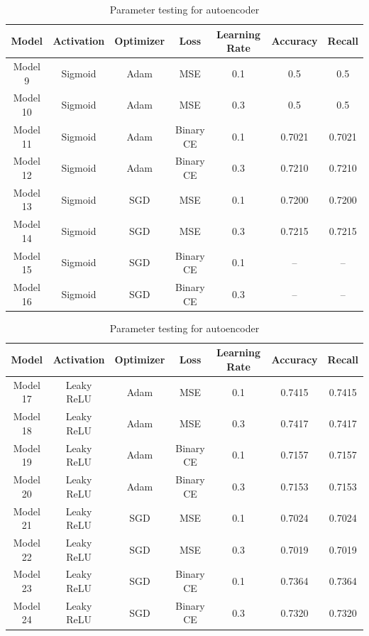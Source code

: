 \begin{table}[H]
    \centering
    \begin{tabular}{|c|c|c|c|c|c|c|}
        \hline
        \rowcolor{lightgreen}
        \textbf{Model} & \textbf{Activation} & \textbf{Optimizer} & \textbf{Loss} & \textbf{Learning Rate} & \textbf{Accuracy} & \textbf{Recall} \\
        \hline
        Model 9 & Sigmoid & Adam & MSE & 0.1 & 0.5 & 0.5 \\
        \hline
        Model 10 & Sigmoid & Adam & MSE & 0.3 & 0.5 & 0.5 \\
        \hline
        Model 11 & Sigmoid & Adam & Binary CE & 0.1 & 0.7021 & 0.7021 \\
        \hline
        Model 12 & Sigmoid & Adam & Binary CE & 0.3 & 0.7210 & 0.7210 \\
        \hline
        Model 13 & Sigmoid & SGD & MSE & 0.1 & 0.7200 & 0.7200 \\
        \hline
        Model 14 & Sigmoid & SGD & MSE & 0.3 & 0.7215 & 0.7215 \\
        \hline
        Model 15 & Sigmoid & SGD & Binary CE & 0.1 & -- & -- \\
        \hline
        Model 16 & Sigmoid & SGD & Binary CE & 0.3 & -- & -- \\
        \hline
    \end{tabular}
    \caption{Parameter testing for autoencoder}
    \label{tab:op2}
\end{table}
\begin{table}[H]
    \centering
    \begin{tabular}{|c|c|c|c|c|c|c|}
        \hline
        \rowcolor{lightgreen}
        \textbf{Model} & \textbf{Activation} & \textbf{Optimizer} & \textbf{Loss} & \textbf{Learning Rate} & \textbf{Accuracy} & \textbf{Recall} \\
        \hline
        Model 17 & Leaky ReLU & Adam & MSE & 0.1 & 0.7415 & 0.7415 \\
        \hline
        Model 18 & Leaky ReLU & Adam & MSE & 0.3 & 0.7417 & 0.7417 \\
        \hline
        Model 19 & Leaky ReLU & Adam & Binary CE & 0.1 & 0.7157 & 0.7157 \\
        \hline
        Model 20 & Leaky ReLU & Adam & Binary CE & 0.3 & 0.7153 & 0.7153 \\
        \hline
        Model 21 & Leaky ReLU & SGD & MSE & 0.1 & 0.7024 & 0.7024 \\
        \hline
        Model 22 & Leaky ReLU & SGD & MSE & 0.3 & 0.7019 & 0.7019 \\
        \hline
        Model 23 & Leaky ReLU & SGD & Binary CE & 0.1 & 0.7364 & 0.7364 \\
        \hline
        Model 24 & Leaky ReLU & SGD & Binary CE & 0.3 & 0.7320 & 0.7320 \\
        \hline
    \end{tabular}
    \caption{Parameter testing for autoencoder}
    \label{tab:op3}
\end{table}
